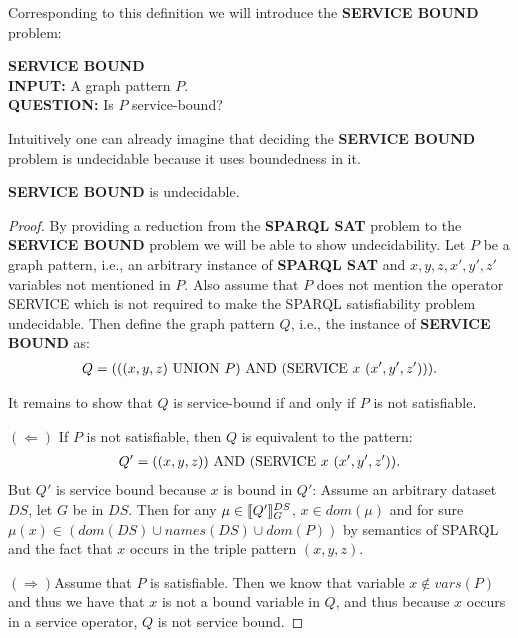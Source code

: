 Corresponding to this definition we will introduce the \textbf{SERVICE BOUND}
problem:
\begin{framed}\noindent \textbf{SERVICE BOUND}\\
	\textbf{INPUT:} A graph pattern $P$.\\
	\textbf{QUESTION:} Is $P$ service-bound?
\end{framed}

Intuitively one can already imagine that deciding the \textbf{SERVICE BOUND}
problem is undecidable because it uses boundedness in it.

\begin{theorem}
	\textbf{SERVICE BOUND} is undecidable.
\end{theorem}
\begin{proof}
By providing a reduction from the \textbf{SPARQL SAT} problem to the  
\textbf{SERVICE BOUND} problem we will be able to show undecidability.
Let $P$ be a graph pattern, i.e., an arbitrary instance of \textbf{SPARQL SAT} and
$x,y,z,x',y',z'$ variables not mentioned in $P$.
Also assume that $P$ does not mention the operator SERVICE which is not required
to make the SPARQL satisfiability problem undecidable.
Then define the graph pattern $Q$, i.e., the instance of \textbf{SERVICE BOUND} as: 
\begin{align*}
	Q = (((x,y,z) \mbox{ UNION }  P) \mbox{ AND } (\mbox{SERVICE } x \ (x', y', z'))).
\end{align*}

\noindent It remains to show that $Q$ is service-bound if and only if $P$ is not
satisfiable.

\bigskip\noindent
$(\Leftarrow)$ \quad If $P$ is not satisfiable, then $Q$ is equivalent to the
pattern: 
\begin{align*}
	Q' = ((x,y,z)) \mbox{ AND } (\mbox{SERVICE} \ x \ (x', y', z')).
\end{align*} 
But $Q'$ is service bound because $x$ is bound in $Q'$: Assume an
arbitrary dataset $DS$, let $G$ be in $DS$. Then 
for any $\mu \in \llbracket Q' \rrbracket^{DS}_G$, $x \in dom(\mu)$ and for sure $\mu(x) \in
(dom(DS) \cup names(DS) \cup dom(P))$ by semantics of SPARQL and the fact that
$x$ occurs in the triple pattern $(x,y,z)$.


\bigskip\noindent
$(\Rightarrow)$\quad Assume that $P$ is satisfiable. Then we know that variable
$x \not\in vars(P)$ and thus we have that $x$ is not a bound variable in $Q$,
and thus because $x$ occurs in a service operator, $Q$ is not service bound.
\end{proof}

